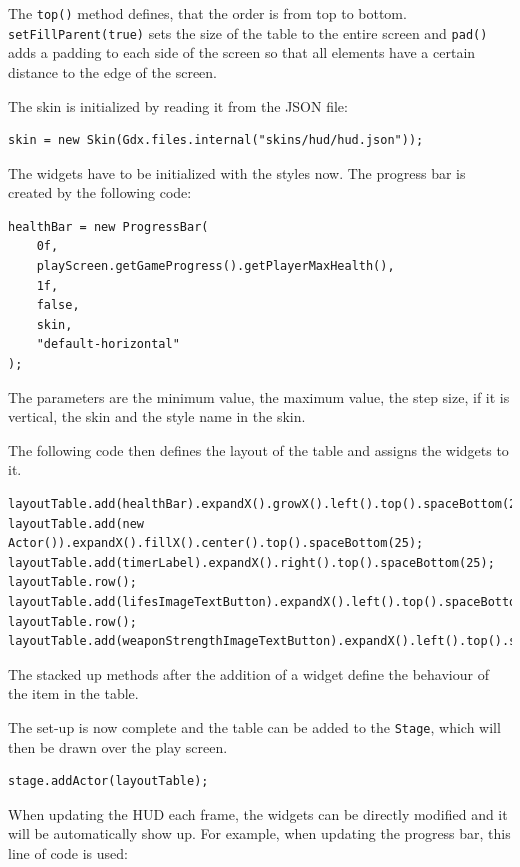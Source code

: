 \documentclass[12p]{article}
\begin{document}
The \texttt{top()} method defines, that the order is from top to bottom. \texttt{setFillParent(true)} sets the size of the table to the entire screen and \texttt{pad()} adds a padding to each side of the screen so that all elements have a certain distance to the edge of the screen.

The skin is initialized by reading it from the JSON file:

\begin{verbatim}
skin = new Skin(Gdx.files.internal("skins/hud/hud.json"));
\end{verbatim}

The widgets have to be initialized with the styles now. The progress bar is created by the following code:

\begin{verbatim}
healthBar = new ProgressBar(
    0f,
    playScreen.getGameProgress().getPlayerMaxHealth(),
    1f,
    false,
    skin,
    "default-horizontal"
);
\end{verbatim}

The parameters are the minimum value, the maximum value, the step size, if it is vertical, the skin and the style name in the skin.

The following code then defines the layout of the table and assigns the widgets to it.

\begin{verbatim}
layoutTable.add(healthBar).expandX().growX().left().top().spaceBottom(25);
layoutTable.add(new Actor()).expandX().fillX().center().top().spaceBottom(25);
layoutTable.add(timerLabel).expandX().right().top().spaceBottom(25);
layoutTable.row();
layoutTable.add(lifesImageTextButton).expandX().left().top().spaceBottom(10);
layoutTable.row();
layoutTable.add(weaponStrengthImageTextButton).expandX().left().top().spaceBottom(10);
\end{verbatim}

The stacked up methods after the addition of a widget define the behaviour of the item in the table.

The set-up is now complete and the table can be added to the \texttt{Stage}, which will then be drawn over the play screen.

\begin{verbatim}
stage.addActor(layoutTable);
\end{verbatim}

When updating the HUD each frame, the widgets can be directly modified and it will be automatically show up. For example, when updating the progress bar, this line of code is used:
\end{document}

